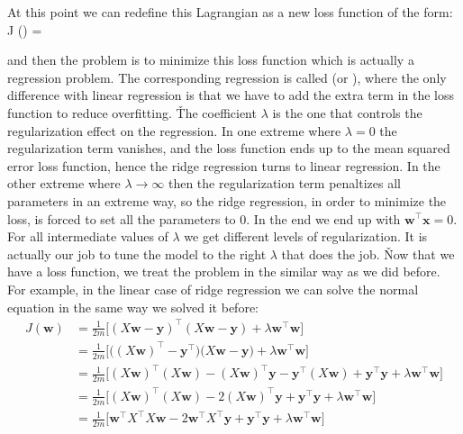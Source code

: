 At this point we can redefine this Lagrangian as a new loss function of the form:
\bse
J () =  
\ese

and then the problem is to minimize this loss function which is actually a regression problem. The corresponding
regression is called  (or ), where the only difference with linear
regression is that we have to add the extra term in the loss function to reduce overfitting. \v

The coefficient $\lambda$ is the one that controls the regularization effect on the regression. In one extreme where
$\lambda=0$ the regularization term vanishes, and the loss function ends up to the mean squared error loss function,
hence the ridge regression turns to linear regression. In the other extreme where $\lambda \to \infty$ then the
regularization term penaltizes all parameters in an extreme way, so the ridge regression, in order to minimize the
loss, is forced to set all the parameters to 0. In the end we end up with $\boldsymbol{w}^{\intercal} \boldsymbol{x}
= 0$. For all intermediate values of $\lambda$ we get different levels of regularization. It is actually our job to
tune the model to the right $\lambda$ that does the job. \v

Now that we have a loss function, we treat the problem in the similar way as we did before. For example, in the
linear case of ridge regression we can solve the normal equation in the same way we solved it before:
{\setlength{\jot}{10pt}
\begin{align*}
J(\boldsymbol{w}) &= \frac{1}{2m} \Big[ (X \boldsymbol{w} - \boldsymbol{y})^{\intercal} (X \boldsymbol{w}
- \boldsymbol{y}) + \lambda \boldsymbol{w}^{\intercal} \boldsymbol{w} \Big]\\
&= \frac{1}{2m} \Big[ \Big( (X \boldsymbol{w})^{\intercal} - \boldsymbol{y}^{\intercal} \Big)
\Big(X\boldsymbol{w} - \boldsymbol{y} \Big) + \lambda \boldsymbol{w}^{\intercal} \boldsymbol{w} \Big]\\
&= \frac{1}{2m} \Big[ (X \boldsymbol{w})^{\intercal} (X \boldsymbol{w}) - (X \boldsymbol{w})^{\intercal}
\boldsymbol{y} - \boldsymbol{y}^{\intercal} (X \boldsymbol{w}) + \boldsymbol{y}^{\intercal} \boldsymbol{y}
+ \lambda \boldsymbol{w}^{\intercal} \boldsymbol{w} \Big] \\
&= \frac{1}{2m} \Big[ (X \boldsymbol{w})^{\intercal} (X \boldsymbol{w}) - 2 (X \boldsymbol{w})^{\intercal}
\boldsymbol{y} + \boldsymbol{y}^{\intercal} \boldsymbol{y} + \lambda \boldsymbol{w}^{\intercal} \boldsymbol{w} \Big] \\
&= \frac{1}{2m} \Big[ \boldsymbol{w}^{\intercal} X^{\intercal} X \boldsymbol{w} - 2 \boldsymbol{w}^{\intercal}
X^{\intercal} \boldsymbol{y} + \boldsymbol{y}^{\intercal} \boldsymbol{y}
+ \lambda \boldsymbol{w}^{\intercal} \boldsymbol{w} \Big]
\end{align*}}

